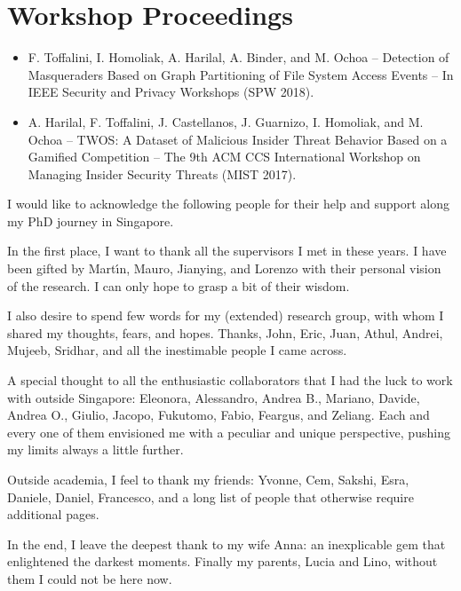 \documentclass[
11pt, %
oneside, %
english, %
singlespacing, %
headsepline, %
]{MastersDoctoralThesis} %
\begin{document}
\begin{publications}
\begin{itemize}
\end{itemize}

\section*{Workshop Proceedings}
\begin{itemize}
	
	\item F. Toffalini, I. Homoliak, A. Harilal, A. Binder, and M. Ochoa --  
	Detection of Masqueraders Based on Graph Partitioning of File System 
	Access Events -- In IEEE Security and Privacy Workshops (SPW 2018).
	
	\item A. Harilal, F. Toffalini, J. Castellanos, J. Guarnizo, I. Homoliak,  
	and M. Ochoa -- TWOS: A Dataset of Malicious Insider Threat Behavior Based 
	on a Gamified Competition -- The 9th ACM CCS International Workshop on 
	Managing Insider Security Threats (MIST 2017).	
\end{itemize}


\end{publications}


\begin{acknowledgements}
\addchaptertocentry{\acknowledgementname} %

I would like to acknowledge the following people for their help and support 
along my PhD journey in Singapore.

In the first place, I want to thank all the supervisors I met in these years. 
I have been gifted by Mart\'{\i}n, Mauro, Jianying, and Lorenzo with their 
personal vision of the research.
I can only hope to grasp a bit of their wisdom.

I also desire to spend few words for my (extended) research group, with whom I 
shared my thoughts, fears, and hopes. Thanks, John, Eric, Juan, Athul, Andrei, 
Mujeeb, Sridhar, and all the inestimable people I came across. 

A special thought to all the enthusiastic collaborators that I had the luck to 
work with outside Singapore: Eleonora, Alessandro, Andrea B., Mariano, Davide, 
Andrea O., Giulio, Jacopo, Fukutomo, Fabio, Feargus, and Zeliang.
Each and every one of them envisioned me with a peculiar and unique 
perspective, pushing my limits always a little further.

Outside academia, I feel to thank my friends: Yvonne, Cem, Sakshi, 
Esra, Daniele, Daniel, Francesco, and a long list of people that otherwise
require additional pages.

In the end, I leave the deepest thank to my wife Anna: an inexplicable gem 
that 
enlightened the darkest moments. Finally my parents, Lucia and Lino, without 
them I could not be here now.

\end{acknowledgements}
\end{document}
